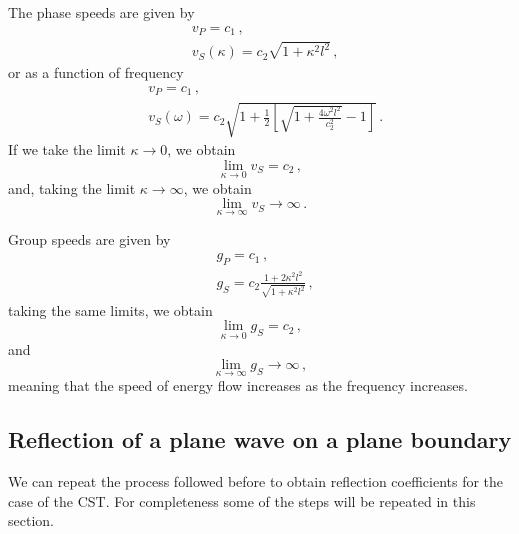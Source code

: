 \documentclass[12pt]{article}
\begin{document}
The phase speeds are given by
\begin{align*}
&v_P = c_1\, ,\\
&v_S(\kappa) = c_2\sqrt{1 + \kappa^2 l^2}\, ,
\end{align*}
or as a function of frequency
\begin{align*}
&v_P = c_1\, ,\\
&v_S(\omega) = c_2\sqrt{1 + \frac{1}{2}\left[\sqrt{1 + \frac{4\omega^2 l^2}{c_2^2}} - 1\right]}\, .
\end{align*}
If we take the limit \(\kappa \rightarrow 0\), we obtain
\[\lim_{\kappa \rightarrow 0} v_S = c_2\, ,\]
and, taking the limit \(\kappa \rightarrow \infty\), we obtain
\[\lim_{\kappa \rightarrow \infty} v_S \rightarrow  \infty\, .\]

Group speeds are given by
\begin{align*}
&g_P = c_1\, ,\\
&g_S = c_2 \frac{1 + 2\kappa^2 l^2}{\sqrt{1 + \kappa^2 l^2}}\, ,
\end{align*}
taking the same limits, we obtain
\[\lim_{\kappa \rightarrow 0} g_S = c_2\, ,\]
and
\[\lim_{\kappa \rightarrow \infty} g_S \rightarrow  \infty\, ,\]
meaning that the speed of energy flow increases as the frequency increases.

\subsection{Reflection of a plane wave on a plane boundary}

We can repeat the process followed before to obtain reflection coefficients for the case of the CST. For completeness some of the steps will be repeated in this section.
\end{document}
